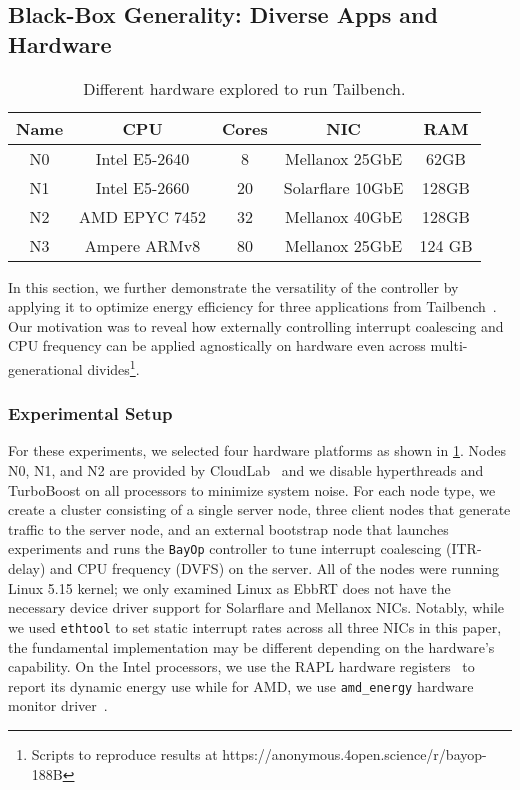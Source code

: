 
\subsection{Black-Box Generality: Diverse Apps and Hardware}
\label{sec:tailbench}
\begin{table}[t]
\small
\begin{tabular}{|c|c|c|c|c|}
    \hline
  Name & CPU & Cores & NIC & RAM\\ \hline
     N0 & Intel E5-2640 & 8 & Mellanox 25GbE & 62GB\\ \hline
     N1 & Intel E5-2660 & 20 & Solarflare 10GbE & 128GB\\ \hline
     N2 & AMD EPYC 7452 & 32 & Mellanox 40GbE & 128GB\\ \hline
     N3 & Ampere ARMv8 & 80 & Mellanox 25GbE & 124 GB \\ \hline
\end{tabular}
\caption{\small Different hardware explored to run Tailbench.}
\label{table:hwsw}
\vspace{-0.2in}
\end{table}

In this section, we further demonstrate the versatility of the controller by applying it to optimize energy efficiency for three applications from Tailbench~\cite{tailbench}. Our motivation was to reveal how externally controlling interrupt coalescing and CPU frequency can be applied agnostically on hardware even across multi-generational divides\footnote{Scripts to reproduce results at https://anonymous.4open.science/r/bayop-188B}.


\subsubsection{Experimental Setup}
For these experiments, we selected four hardware platforms as shown in \cref{table:hwsw}. Nodes N0, N1, and N2 are provided by CloudLab~\cite{cloudlab} and we disable hyperthreads and TurboBoost on all processors to minimize system noise. For each node type, we create a cluster consisting of a single server node, three client nodes that generate traffic to the server node, and an external bootstrap node that launches experiments and runs the \texttt{BayOp} controller to tune interrupt coalescing (ITR-delay) and CPU frequency (DVFS) on the server. All of the nodes were running Linux 5.15 kernel; we only examined Linux as EbbRT does not have the necessary device driver support for Solarflare and Mellanox NICs. Notably, while we used \texttt{ethtool} to set static interrupt rates across all three NICs in this paper, the fundamental implementation may be different depending on the hardware's capability. On the Intel processors, we use the RAPL hardware registers~\cite{rapl} to report its dynamic energy use while for AMD, we use \texttt{amd\_energy} hardware monitor driver~\cite{amdenergy}.  


